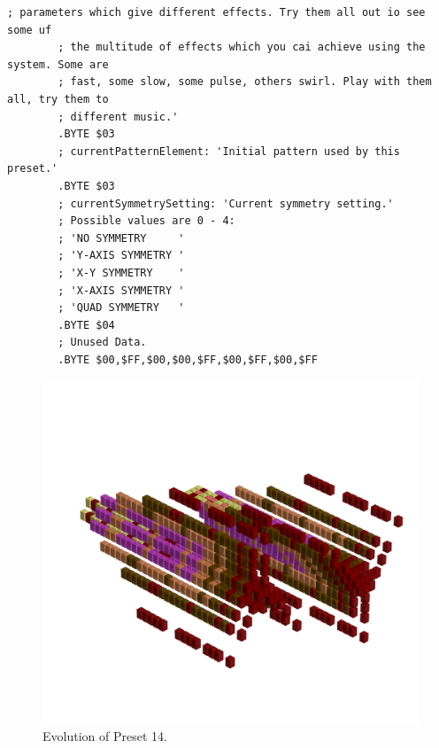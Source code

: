 \begin{lstlisting}[basicstyle=\ttfamily\tiny,caption=Source code for Preset 13.]
        ; parameters which give different effects. Try them all out io see some uf
        ; the multitude of effects which you cai achieve using the system. Some are
        ; fast, some slow, some pulse, others swirl. Play with them all, try them to
        ; different music.'
        .BYTE $03
        ; currentPatternElement: 'Initial pattern used by this preset.'
        .BYTE $03
        ; currentSymmetrySetting: 'Current symmetry setting.'
        ; Possible values are 0 - 4:
        ; 'NO SYMMETRY     '
        ; 'Y-AXIS SYMMETRY '
        ; 'X-Y SYMMETRY    '
        ; 'X-AXIS SYMMETRY '
        ; 'QUAD SYMMETRY   '
        .BYTE $04
        ; Unused Data.
        .BYTE $00,$FF,$00,$00,$FF,$00,$FF,$00,$FF
\end{lstlisting}


\clearpage                                                                 
\begin{figure}[H]                                                          
    \centering                                                             
    \begin{adjustbox}{width=14cm,center}                                   
      \includegraphics[width=14cm]{src/presets/pattern14-45.png}%
    \end{adjustbox}                                                        
\caption{Evolution of Preset 14.}                                           
\end{figure}                                                               
\clearpage                                                                 
                                                                           
